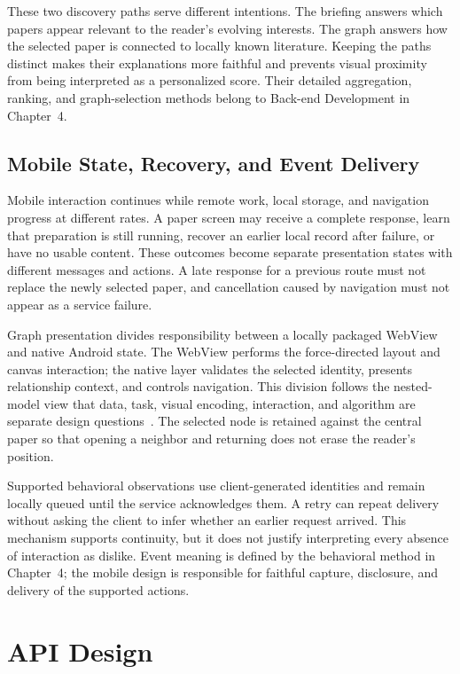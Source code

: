 These two discovery paths serve different intentions. The briefing answers which papers appear relevant to the reader's evolving interests. The graph answers how the selected paper is connected to locally known literature. Keeping the paths distinct makes their explanations more faithful and prevents visual proximity from being interpreted as a personalized score. Their detailed aggregation, ranking, and graph-selection methods belong to Back-end Development in Chapter~4.

\subsection{Mobile State, Recovery, and Event Delivery}
\label{subsec:mobile-state-recovery}

Mobile interaction continues while remote work, local storage, and navigation progress at different rates. A paper screen may receive a complete response, learn that preparation is still running, recover an earlier local record after failure, or have no usable content. These outcomes become separate presentation states with different messages and actions. A late response for a previous route must not replace the newly selected paper, and cancellation caused by navigation must not appear as a service failure.

Graph presentation divides responsibility between a locally packaged WebView and native Android state. The WebView performs the force-directed layout and canvas interaction; the native layer validates the selected identity, presents relationship context, and controls navigation. This division follows the nested-model view that data, task, visual encoding, interaction, and algorithm are separate design questions~\cite{munzner2009nested}. The selected node is retained against the central paper so that opening a neighbor and returning does not erase the reader's position.

Supported behavioral observations use client-generated identities and remain locally queued until the service acknowledges them. A retry can repeat delivery without asking the client to infer whether an earlier request arrived. This mechanism supports continuity, but it does not justify interpreting every absence of interaction as dislike. Event meaning is defined by the behavioral method in Chapter~4; the mobile design is responsible for faithful capture, disclosure, and delivery of the supported actions.

\section{API Design}
\label{sec:api-design}


